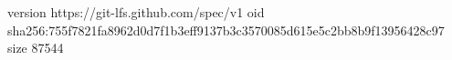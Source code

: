 version https://git-lfs.github.com/spec/v1
oid sha256:755f7821fa8962d0d7f1b3eff9137b3c3570085d615e5c2bb8b9f13956428c97
size 87544
